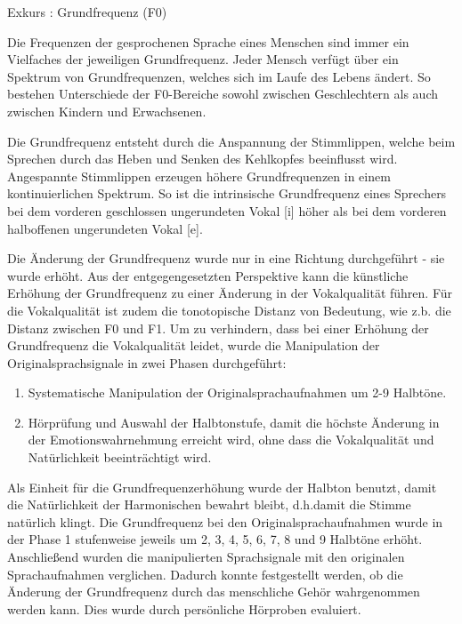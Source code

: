 \documentclass[11pt,a4paper,headsepline,twoside,toc=bibliography]{scrreprt}
\begin{document}
\begin{tcolorbox}
	
	Exkurs : Grundfrequenz (F0)
	
	Die Frequenzen der gesprochenen Sprache eines Menschen sind immer ein Vielfaches der jeweiligen Grundfrequenz.
	Jeder Mensch verfügt über ein Spektrum von Grundfrequenzen, welches sich im Laufe des Lebens ändert. So bestehen Unterschiede der F0-Bereiche sowohl zwischen Geschlechtern als auch zwischen Kindern und Erwachsenen.
	
	Die Grundfrequenz entsteht durch die Anspannung der Stimmlippen, welche beim Sprechen durch das Heben und Senken des Kehlkopfes beeinflusst wird. Angespannte Stimmlippen erzeugen höhere Grundfrequenzen in einem kontinuierlichen Spektrum. So ist die intrinsische Grundfrequenz eines Sprechers bei dem vorderen geschlossen ungerundeten Vokal [i] höher als bei dem vorderen halboffenen ungerundeten Vokal [e].

\end{tcolorbox}

\bigskip

\noindent
Die Änderung der Grundfrequenz wurde nur in eine Richtung durchgeführt - sie wurde erhöht. Aus der entgegengesetzten Perspektive kann die künstliche Erhöhung der Grundfrequenz zu einer
Änderung in der Vokalqualität führen. Für die Vokalqualität ist zudem die tonotopische Distanz von Bedeutung, wie z.b. die Distanz zwischen F0 und F1. Um zu verhindern, dass bei einer Erhöhung der Grundfrequenz die Vokalqualität leidet, wurde die Manipulation der Originalsprachsignale in zwei Phasen durchgeführt:

\begin{enumerate}
\item Systematische Manipulation der Originalsprachaufnahmen um 2-9 Halbtöne.
\item Hörprüfung und Auswahl der Halbtonstufe, damit die höchste Änderung in der Emotionswahrnehmung erreicht wird, ohne dass die Vokalqualität und Natürlichkeit beeinträchtigt wird.
\end{enumerate}



Als Einheit für die Grundfrequenzerhöhung wurde der Halbton benutzt, damit die Natürlichkeit der Harmonischen bewahrt bleibt, d.h.damit die Stimme natürlich klingt. Die Grundfrequenz bei den Originalsprachaufnahmen wurde in der Phase 1 stufenweise jeweils um 2, 3, 4, 5, 6, 7, 8 und 9 Halbtöne erhöht. Anschließend wurden die manipulierten Sprachsignale mit den originalen Sprachaufnahmen verglichen. Dadurch konnte festgestellt werden, ob die Änderung der Grundfrequenz durch das menschliche Gehör wahrgenommen werden kann. Dies wurde durch persönliche Hörproben evaluiert. \\
\end{document}
